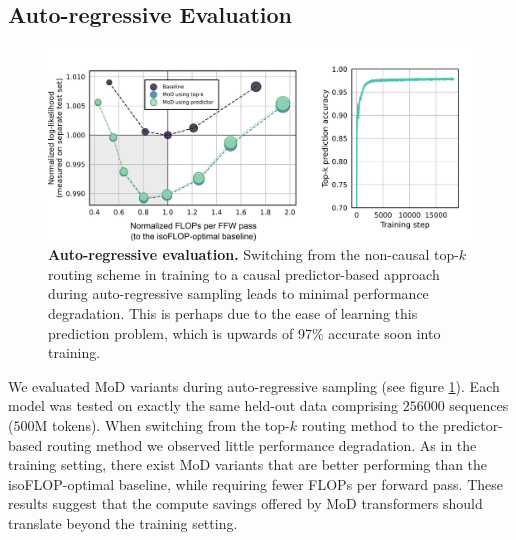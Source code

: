 \documentclass[11pt, a4paper, onecolumn, logo, copyright]{googledeepmind}
\begin{document}
\subsection{Auto-regressive Evaluation}
\begin{figure}[h]
    \centering
    \includegraphics[width=\textwidth]{autoregressive.png}
    \caption{\textbf{Auto-regressive evaluation.} Switching from the non-causal top-$k$ routing scheme in training to a causal predictor-based approach during auto-regressive sampling leads to minimal performance degradation. This is perhaps due to the ease of learning this prediction problem, which is upwards of 97\% accurate soon into training.}
    \label{fig:autoregressive}
\end{figure}

We evaluated MoD variants during auto-regressive sampling (see figure \ref{fig:autoregressive}). Each model was tested on exactly the same held-out data comprising $256000$ sequences ($500$M tokens). When switching from the top-$k$ routing method to the predictor-based routing method we observed little performance degradation. As in the training setting, there exist MoD variants that are better performing than the isoFLOP-optimal baseline, while requiring fewer FLOPs per forward pass. These results suggest that the compute savings offered by MoD transformers should translate beyond the training setting. 
\end{document}

